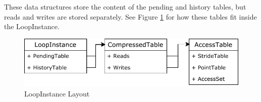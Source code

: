 \documentclass[12pt,twoside]{reedthesis}
\begin{document}
			These data structures store the content of the pending and history tables, but reads and writes are stored separately. See Figure \ref{fig:loopinstance} for how these tables fit inside the LoopInstance. 
			
			\begin{figure}[H]
				\caption{LoopInstance Layout}
				\label{fig:loopinstance}
				\includegraphics[scale=1.0]{LoopData.pdf}
			\end{figure}
			
			
%			
\end{document}
